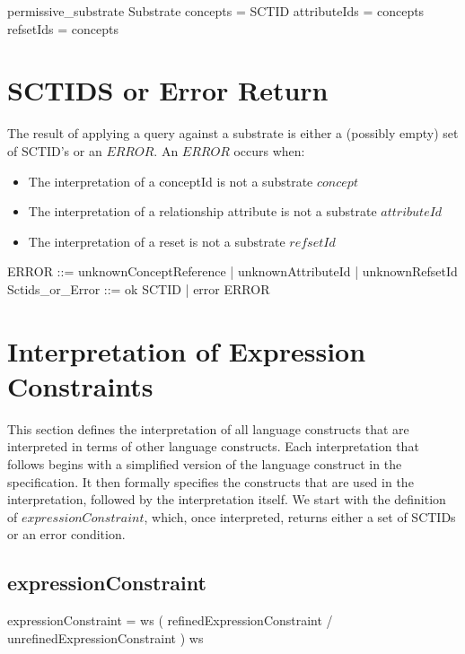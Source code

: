 \documentclass{article}
\def\bnf#1{{\scriptsize {{#1}} }}
\begin{document}
 
 \begin{schema}{permissive\_substrate}
    Substrate
\where
    concepts = SCTID \land attributeIds = concepts \land refsetIds = concepts 
\end{schema}
   


\section{SCTIDS or Error Return}
The result of applying a query against a substrate is either a (possibly empty) set of SCTID's or an $ERROR$.  An $ERROR$ occurs when:
\begin{itemize}[noitemsep,nolistsep]
\item The interpretation of a conceptId is not a substrate $concept$
\item The interpretation of a relationship attribute is not a substrate $attributeId$
\item The interpretation of a reset is not a substrate $refsetId$
\end{itemize}


\begin{zed}  
ERROR ::= unknownConceptReference | unknownAttributeId | unknownRefsetId 
\also
Sctids\_or\_Error ::= ok \ldata \power SCTID \rdata | error \ldata ERROR \rdata 
\end{zed}

\section{Interpretation of Expression Constraints}
This section defines the interpretation of all language constructs that are interpreted in terms of other language constructs.  Each interpretation that follows begins with a simplified version
of the language construct in the specification.  It then formally specifies the constructs that are used in the interpretation, followed by the interpretation itself. We start with the definition 
of $expressionConstraint$, which, once interpreted, returns either a set of SCTIDs or an error condition.
\subsection{expressionConstraint}
\begin{framed}
\noindent
\bnf{expressionConstraint = ws ( refinedExpressionConstraint / unrefinedExpressionConstraint ) ws}
\end{framed}
\end{document}
